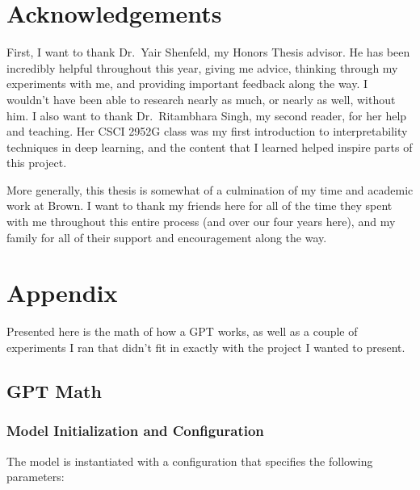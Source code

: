 \documentclass[11pt]{article}
\begin{document}
    \section{Acknowledgements}\label{acknowledgements}

First, I want to thank Dr.~Yair Shenfeld, my Honors Thesis advisor. He
has been incredibly helpful throughout this year, giving me advice,
thinking through my experiments with me, and providing important
feedback along the way. I wouldn't have been able to research nearly as
much, or nearly as well, without him. I also want to thank
Dr.~Ritambhara Singh, my second reader, for her help and teaching. Her
CSCI 2952G class was my first introduction to interpretability
techniques in deep learning, and the content that I learned helped
inspire parts of this project.

More generally, this thesis is somewhat of a culmination of my time and
academic work at Brown. I want to thank my friends here for all of the
time they spent with me throughout this entire process (and over our
four years here), and my family for all of their support and
encouragement along the way.

    \section{Appendix}\label{appendix}

Presented here is the math of how a GPT works, as well as a couple of
experiments I ran that didn't fit in exactly with the project I wanted
to present.

\subsection{GPT Math}\label{gpt-math}

\subsubsection{Model Initialization and
Configuration}\label{model-initialization-and-configuration}

The model is instantiated with a configuration that specifies the
following parameters:
\end{document}

